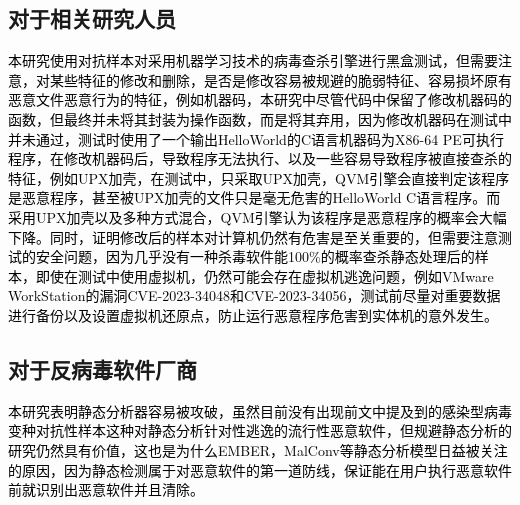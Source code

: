 \subsection{对于相关研究人员}

\textcolor{black}{本研究使用对抗样本对采用机器学习技术的病毒查杀引擎进行黑盒测试，但需要注意，对某些特征的修改和删除，是否是修改容易被规避的脆弱特征、容易损坏原有恶意文件恶意行为的特征，例如机器码，本研究中尽管代码中保留了修改机器码的函数，但最终并未将其封装为操作函数，而是将其弃用，因为修改机器码在测试中并未通过，测试时使用了一个输出HelloWorld的C语言机器码为X86-64 PE可执行程序，在修改机器码后，导致程序无法执行、以及一些容易导致程序被直接查杀的特征，例如UPX加壳，在测试中，只采取UPX加壳，QVM引擎会直接判定该程序是恶意程序，甚至被UPX加壳的文件只是毫无危害的HelloWorld C语言程序。而采用UPX加壳以及多种方式混合，QVM引擎认为该程序是恶意程序的概率会大幅下降。同时，证明修改后的样本对计算机仍然有危害是至关重要的，但需要注意测试的安全问题，因为几乎没有一种杀毒软件能100\%的概率查杀静态处理后的样本，即使在测试中使用虚拟机，仍然可能会存在虚拟机逃逸问题，例如VMware WorkStation的漏洞CVE-2023-34048和CVE-2023-34056，测试前尽量对重要数据进行备份以及设置虚拟机还原点，防止运行恶意程序危害到实体机的意外发生。}

\subsection{对于反病毒软件厂商}

\textcolor{black}{本研究表明静态分析器容易被攻破，虽然目前没有出现前文中提及到的感染型病毒变种对抗性样本这种对静态分析针对性逃逸的流行性恶意软件，但规避静态分析的研究仍然具有价值，这也是为什么EMBER，MalConv等静态分析模型日益被关注的原因\parencite{ref15}，因为静态检测属于对恶意软件的第一道防线，保证能在用户执行恶意软件前就识别出恶意软件并且清除。}

